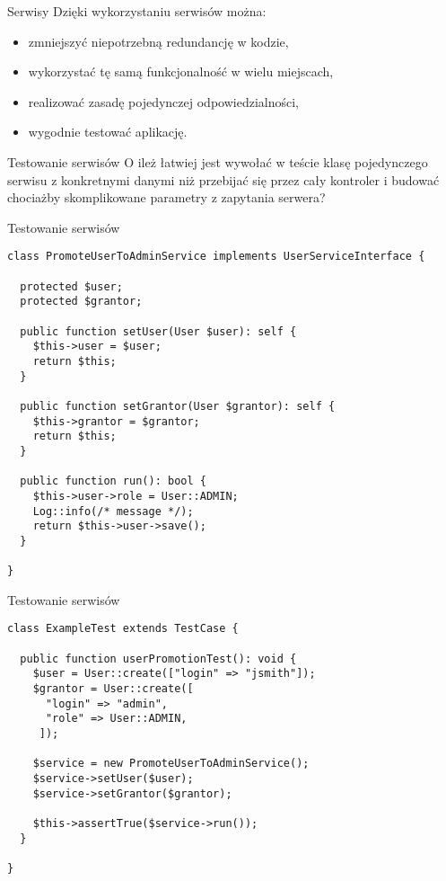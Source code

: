 \begin{frame}{Serwisy}
	Dzięki wykorzystaniu serwisów można:
	\begin{itemize}
		\item zmniejszyć niepotrzebną redundancję w kodzie,
		\item wykorzystać tę samą funkcjonalność w wielu miejscach,
		\item realizować zasadę pojedynczej odpowiedzialności,
		\item wygodnie testować aplikację.
	\end{itemize}
\end{frame}

\begin{frame}{Testowanie serwisów}
	O ileż łatwiej jest wywołać w teście klasę pojedynczego serwisu z konkretnymi danymi niż przebijać się przez cały kontroler i budować chociażby skomplikowane parametry z zapytania serwera?
\end{frame}

\begin{frame}[fragile]{Testowanie serwisów}
	\begin{lstlisting}
class PromoteUserToAdminService implements UserServiceInterface {

  protected $user;
  protected $grantor;

  public function setUser(User $user): self {
    $this->user = $user;
    return $this;
  }

  public function setGrantor(User $grantor): self {
    $this->grantor = $grantor;
    return $this;
  }

  public function run(): bool {
    $this->user->role = User::ADMIN;
    Log::info(/* message */);
    return $this->user->save();
  }

}
	\end{lstlisting}
\end{frame}

\begin{frame}[fragile]{Testowanie serwisów}
	\begin{lstlisting}
class ExampleTest extends TestCase {

  public function userPromotionTest(): void {
    $user = User::create(["login" => "jsmith"]);
    $grantor = User::create([
      "login" => "admin",
      "role" => User::ADMIN,
     ]);
    
    $service = new PromoteUserToAdminService();
    $service->setUser($user);
    $service->setGrantor($grantor);
      
    $this->assertTrue($service->run());
  }
  
}
	\end{lstlisting}
\end{frame}

